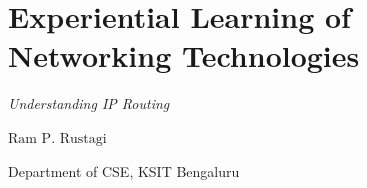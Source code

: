 \chapter{Experiential Learning of Networking Technologies}

\vskip -15pt

\centerline{{\LARGE\sl Understanding IP Routing}}


\vskip 0.8cm

\begin{center}
{\large\uppercase{$\text{Ram P. Rustagi}$}} 

\vskip -6pt

Department of CSE, KSIT Bengaluru 

\end{center}

\vskip 2cm




\vfill




\newpage

